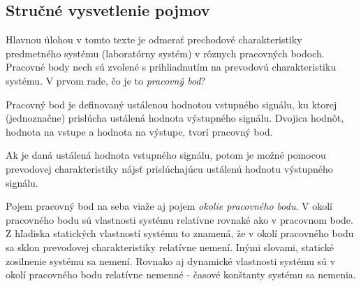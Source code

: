 \documentclass[a4paper, 10pt, ]{article}
\begin{document}
\begin{figure}[t]
	\centering


    \vspace{-4mm}

	\caption{}
	\label{Prevodová charakteristika graf4}

\end{figure}





\subsection{Stručné vysvetlenie pojmov}

Hlavnou úlohou v tomto texte je odmerať prechodové charakteristiky predmetného systému (laboratórny systém) v rôznych pracovných bodoch. Pracovné body nech sú zvolené s prihliadnutím na prevodovú charakteristiku systému. V prvom rade, čo je to \emph{pracovný bod}?


\bigskip


Pracovný bod je definovaný ustálenou hodnotou vstupného signálu, ku ktorej (jednoznačne) prislúcha ustálená hodnota výstupného signálu. Dvojica hodnôt, hodnota na vstupe a hodnota na výstupe, tvorí pracovný bod.

Ak je daná ustálená hodnota vstupného signálu, potom je možné pomocou prevodovej charakteristiky nájsť prislúchajúcu ustálenú hodnotu výstupného signálu.

Pojem pracovný bod na seba viaže aj pojem \emph{okolie pracovného bodu}. V okolí pracovného bodu sú vlastnosti systému relatívne rovnaké ako v pracovnom bode. Z hľadiska statických vlastností systému to znamená, že v okolí pracovného bodu sa sklon prevodovej charakteristiky relatívne nemení. Inými slovami, statické zosilnenie systému sa nemení. Rovnako aj dynamické vlastnosti systému sú v okolí pracovného bodu relatívne nemenné - časové konštanty systému sa nemenia.
\end{document}
